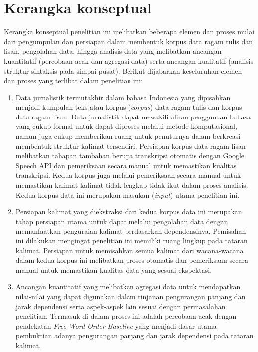 \section{Kerangka konseptual}
Kerangka konseptual penelitian ini melibatkan beberapa elemen dan proses mulai dari pengumpulan dan persiapan dalam membentuk korpus data ragam tulis dan lisan, pengolahan data, hingga analisis data yang melibatkan ancangan kuantitatif (percobaan acak dan agregasi data) serta ancangan kualitatif (analisis struktur sintaksis pada simpai pusat). Berikut dijabarkan keseluruhan elemen dan proses yang terlibat dalam penelitian ini:

\begin{enumerate}
	\item Data jurnalistik termutakhir dalam bahasa Indonesia yang dipisahkan menjadi kumpulan teks atau korpus (\textit{corpus}) data ragam tulis dan korpus data ragam lisan. Data jurnalistik dapat mewakili aliran penggunaan bahasa yang cukup formal untuk dapat diproses melalui metode komputasional, namun juga cukup memberikan ruang untuk penuturnya dalam berkreasi membentuk struktur kalimat tersendiri. Persiapan korpus data ragam lisan melibatkan tahapan tambahan berupa transkripsi otomatis dengan Google Speech API dan pemeriksaan secara manual untuk memastikan kualitas transkripsi. Kedua korpus juga melalui pemeriksaan secara manual untuk memastikan kalimat-kalimat tidak lengkap tidak ikut dalam proses analisis. Kedua korpus data ini merupakan masukan (\textit{input}) utama penelitian ini.
	\item Persiapan kalimat yang diekstraksi dari kedua korpus data ini merupakan tahap persiapan utama untuk dapat melalui pengolahan data dengan memanfaatkan penguraian kalimat berdasarkan dependensinya. Pemisahan ini dilakukan mengingat penelitian ini memiliki ruang lingkup pada tataran kalimat. Persiapan untuk memisahkan semua kalimat dari wacana-wacana dalam kedua korpus ini melibatkan proses otomatis dan pemeriksaan secara manual untuk memastikan kualitas data yang sesuai ekspektasi. 
	\item Ancangan kuantitatif yang melibatkan agregasi data untuk mendapatkan nilai-nilai yang dapat digunakan dalam tinjauan pengurangan panjang dan jarak dependensi serta aspek-aspek lain sesuai dengan permasalahan penelitian. Termasuk di dalam proses ini adalah percobaan acak dengan pendekatan \textit{Free Word Order Baseline} yang menjadi dasar utama pembuktian adanya pengurangan panjang dan jarak dependensi pada tataran kalimat.

\end{enumerate}
